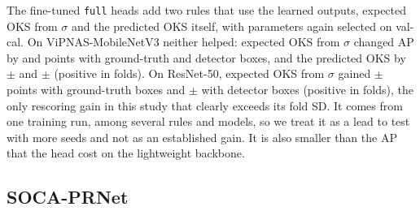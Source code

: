 \documentclass[preprint,11pt]{elsarticle}
\begin{document}
The fine-tuned \texttt{full} heads add two rules that use the learned outputs, expected OKS from
$\sigma$ and the predicted OKS itself, with parameters again selected on val-cal. On ViPNAS-MobileNetV3
neither helped: expected OKS from $\sigma$ changed AP by \DapFtMbvThreeFullSZeroEoksHet{} and
\DapFtMbvThreeFullSZeroDetEoksHet{} points with ground-truth and detector boxes, and the predicted OKS by
\DapFtMbvThreeFullSZeroPredOks{} $\pm$ \DapSdFtMbvThreeFullSZeroPredOks{} and
\DapFtMbvThreeFullSZeroDetPredOks{} $\pm$ \DapSdFtMbvThreeFullSZeroDetPredOks{} (positive in
\DapPosFtMbvThreeFullSZeroDetPredOks{} folds). On ResNet-50, expected OKS from $\sigma$ gained
\DapFtRFiveZeroFullSZeroEoksHet{} $\pm$ \DapSdFtRFiveZeroFullSZeroEoksHet{} points with ground-truth boxes
and \DapFtRFiveZeroFullSZeroDetEoksHet{} $\pm$ \DapSdFtRFiveZeroFullSZeroDetEoksHet{} with detector boxes
(positive in \DapPosFtRFiveZeroFullSZeroDetEoksHet{} folds), the only rescoring gain in this study that
clearly exceeds its fold SD. It comes from one training run, among several rules and models, so we treat
it as a lead to test with more seeds and not as an established gain. It is also smaller than the AP that
the head cost on the lightweight backbone.

\begin{table}[t]
\centering\scriptsize
\caption{Instance rescoring on the test split, with parameters selected on the calibration split, for
the pretrained SimCC models and the fine-tuned full heads (seed 0). All models use SimCC.
$\Delta$AP is in percentage points, paired over 10 folds. Test AP differs from
Table~\ref{tab:sanity} because it covers the test images only.}
\label{tab:rescoring}
\end{table}

\subsection{SOCA-PRNet}
\end{document}
